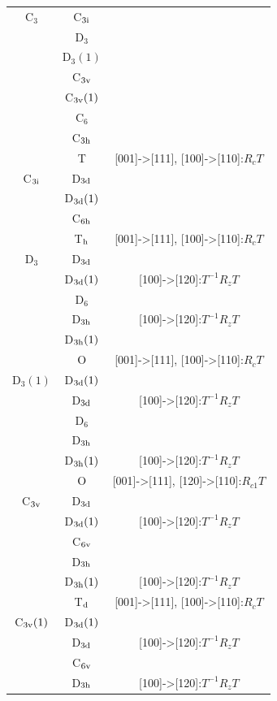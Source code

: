 \documentclass[11pt]{easymemo}
\begin{document}
\begin{table}[t]
\begin{center}
\begin{tabular}{ccc}
C$_3$ & C$_{\rm 3i}$ & \\
   & D$_3$ & \\
   & D$_3(1)$ & \\
   & C$_{\rm 3v}$ & \\
   & C$_{\rm 3v}(1)$ & \\
   & C$_6$ & \\
   & C$_{\rm 3h}$ & \\
   & T & [001]->[111], [100]->[110]:$R_cT$ \\ \hline
C$_{\rm 3i}$ & D$_{\rm 3d}$ & \\
    & D$_{\rm 3d}(1)$ & \\
    & C$_{\rm 6h}$ & \\
    & T$_{\rm h}$ & [001]->[111], [100]->[110]:$R_cT$ \\ \hline
D$_3$ & D$_{\rm 3d}$ & \\
   & D$_{\rm 3d}(1)$ & [100]->[120]:$T^{-1} R_z T$ \\
   & D$_6$ & \\
   & D$_{\rm 3h}$ & [100]->[120]:$T^{-1} R_z T$ \\
   & D$_{\rm 3h}(1)$ & \\
   & O & [001]->[111], [100]->[110]:$R_cT$ \\ \hline
D$_3(1)$ & D$_{\rm 3d}(1)$ & \\
     & D$_{\rm 3d}$ & [100]->[120]:$T^{-1} R_z T$ \\
     & D$_6$ & \\
     & D$_{\rm 3h}$ & \\
     & D$_{\rm 3h}(1)$ & [100]->[120]:$T^{-1} R_z T$ \\
     & O & [001]->[111], [120]->[110]:$R_{c1}T$ \\ \hline
C$_{\rm 3v}$ & D$_{\rm 3d}$ & \\
    & D$_{\rm 3d}(1)$ & [100]->[120]:$T^{-1} R_z T$ \\
    & C$_{\rm 6v}$ & \\
    & D$_{\rm 3h}$ & \\
    & D$_{\rm 3h}(1)$ & [100]->[120]:$T^{-1} R_z T$ \\
    & T$_{\rm d}$ & [001]->[111], [100]->[110]:$R_cT$ \\ \hline
C$_{\rm 3v}(1)$ & D$_{\rm 3d}(1)$ & \\
      & D$_{\rm 3d}$ & [100]->[120]:$T^{-1} R_z T$ \\
      & C$_{\rm 6v}$ & \\
      & D$_{\rm 3h}$ & [100]->[120]:$T^{-1} R_z T$ \\

\end{tabular}
\end{center}
\end{table}
\end{document}
